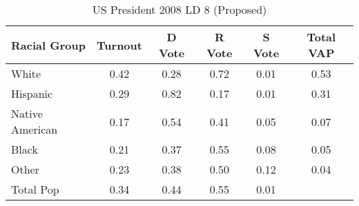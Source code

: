 \begin{table}[htb]
\begin{center}
\caption{US President 2008 LD 8 (Proposed)}
\label{pres08_vap_ld_8}
\begin{tabular}{lccccc}
  \hline
Racial Group & Turnout & D Vote & R Vote & S Vote & Total VAP \\ 
  \hline
White & 0.42 & 0.28 & 0.72 & 0.01 & 0.53 \\ 
  Hispanic & 0.29 & 0.82 & 0.17 & 0.01 & 0.31 \\ 
  Native American & 0.17 & 0.54 & 0.41 & 0.05 & 0.07 \\ 
  Black & 0.21 & 0.37 & 0.55 & 0.08 & 0.05 \\ 
  Other & 0.23 & 0.38 & 0.50 & 0.12 & 0.04 \\ 
  Total Pop & 0.34 & 0.44 & 0.55 & 0.01 &  \\ 
   \hline
\end{tabular}
\end{center}
\end{table}

